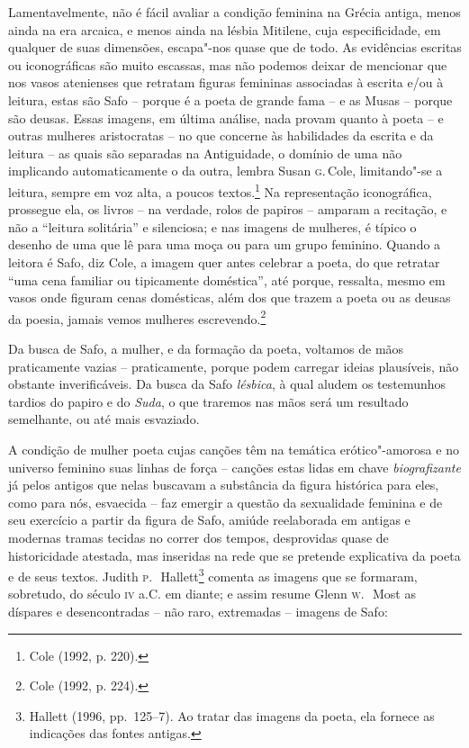 Lamentavelmente, não é fácil avaliar a condição feminina na Grécia
antiga, menos ainda na era arcaica, e menos ainda na lésbia Mitilene, cuja
especificidade, em qualquer de suas dimensões, escapa"-nos quase que
de todo. As evidências escritas ou iconográficas são muito
escassas, mas não podemos deixar de mencionar que nos vasos atenienses que
retratam figuras femininas associadas à escrita e/ou à leitura, estas são Safo
-- porque é a poeta de grande fama -- e as Musas -- porque são deusas.
Essas imagens, em última análise, nada provam quanto à poeta -- e outras mulheres
aristocratas -- no que concerne às habilidades da escrita e da leitura -- as
quais são separadas na Antiguidade, o domínio de uma não implicando
automaticamente o da outra, lembra Susan \textsc{g}.\,Cole, limitando"-se a
leitura, sempre em voz alta, a poucos textos.\footnote{ Cole (1992, p. 220).} Na representação iconográfica,
prossegue ela, os livros -- na verdade, rolos de papiros -- amparam a
recitação, e não a “leitura solitária” e silenciosa; e nas imagens de mulheres,
é típico o desenho de uma que lê para uma moça ou para um grupo feminino.
Quando a leitora é Safo, diz Cole, a imagem quer antes celebrar a poeta, do que
retratar “uma cena familiar ou tipicamente doméstica”, até porque, ressalta,
mesmo em vasos onde figuram cenas domésticas, além dos que trazem a poeta ou as
deusas da poesia, jamais vemos mulheres escrevendo.\footnote{ Cole (1992, p. 224).}

Da busca de Safo, a mulher, e da formação da poeta, voltamos de mãos
praticamente vazias -- praticamente, porque podem carregar ideias plausíveis,
não obstante inverificáveis. Da busca da Safo \textit{lésbica}, à qual
aludem os testemunhos tardios do papiro e do \textit{Suda}, o que traremos nas
mãos será um resultado semelhante, ou até mais esvaziado.

A condição de mulher poeta cujas canções têm na temática erótico"-amorosa e no
universo feminino suas linhas de força -- canções estas lidas em chave
\textit{biografizante} já pelos antigos que nelas buscavam a substância da figura
histórica para eles, como para nós, esvaecida -- faz emergir a questão da
sexualidade feminina e de seu exercício a partir da figura de Safo,
amiúde reelaborada em antigas e modernas tramas tecidas no correr dos
tempos, desprovidas quase de historicidade atestada, mas
inseridas na rede que se pretende explicativa da poeta e de seus textos. Judith
\textsc{p}.~\,Hallett\footnote{ Hallett (1996, pp.~125--7). Ao tratar das
imagens da poeta, ela fornece as indicações das fontes antigas.} comenta as
imagens que se formaram, sobretudo, do século \textsc{iv} a.C. em diante; e assim resume
Glenn \textsc{w}.~\,Most as díspares e desencontradas -- não raro,
extremadas -- imagens de Safo: 

